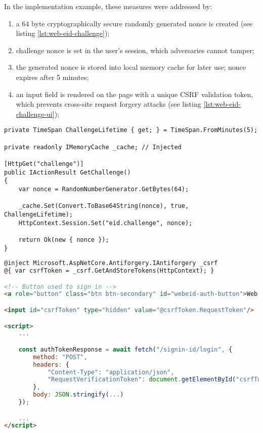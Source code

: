 In the implementation example, these measures were addressed by:
\begin{enumerate}
  \item a 64 byte cryptographically secure randomly generated nonce is created (see listing \ref{lst:web-eid-challenge});
  \item challenge nonce is set in the user's session, which adversaries cannot tamper;
  \item the generated nonce is stored into local memory cache for later use; nonce expires after 5 minutes;
  \item an input field is rendered on the page with a unique CSRF validation token, which prevents cross-site request forgery attacks (see listing \ref{lst:web-eid-challenge-ui});
\end{enumerate}

\begin{lstlisting}[caption={Web eID Challenge Endpoint}, label={lst:web-eid-challenge}]
private TimeSpan ChallengeLifetime { get; } = TimeSpan.FromMinutes(5);

private readonly IMemoryCache _cache; // Injected

[HttpGet("challenge")]
public IActionResult GetChallenge()
{
    var nonce = RandomNumberGenerator.GetBytes(64);

    _cache.Set(Convert.ToBase64String(nonce), true, ChallengeLifetime);
    HttpContext.Session.Set("eid.challenge", nonce);

    return Ok(new { nonce });
}
\end{lstlisting}


\begin{lstlisting}[caption={Web eID UI excerpt}, label={lst:web-eid-challenge-ui}, language={html}]
@inject Microsoft.AspNetCore.Antiforgery.IAntiforgery _csrf
@{ var csrfToken = _csrf.GetAndStoreTokens(HttpContext); }

<!-- Button used to sign in -->
<a role="button" class="btn btn-secondary" id="webeid-auth-button">Web eID</a>

<input id="csrfToken" type="hidden" value="@csrfToken.RequestToken"/>

<script>
    ...

    const authTokenResponse = await fetch("/signin-id/login", {
        method: "POST",
        headers: {
            "Content-Type": "application/json",
            "RequestVerificationToken": document.getElementById("csrfToken").value
        },
        body: JSON.stringify(...)
    });

    ...
</script>
\end{lstlisting}

